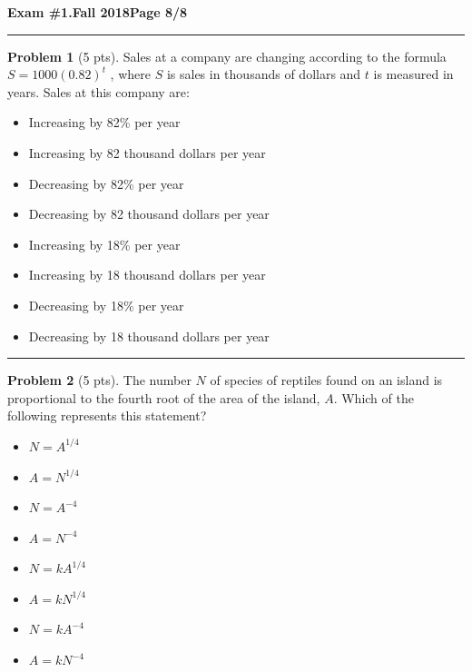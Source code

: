 \documentclass[12pt]{article}
\makeatletter
\theoremstyle{definition}
\newtheorem{problem}{Problem}
\newcommand*{\radiobutton}{%
  \@ifstar{\@radiobutton0}{\@radiobutton1}%
}
\newcommand*{\@radiobutton}[1]{%
  \begin{tikzpicture}
    \pgfmathsetlengthmacro\radius{height("X")/2}
    \draw[radius=\radius] circle;
    \ifcase#1 \fill[radius=.6*\radius] circle;\fi
  \end{tikzpicture}%
}
\makeatother
\begin{document}
\hfill{\large\bf Exam \#1.}\hfill{\large\bf  Fall 2018}\hfill{\large\bf Page 8/8}\hrule

\bigskip
\begin{problem}[5 pts]
  Sales at a company are changing according to the formula $S = 1000 (0.82)^t$ , where $S$ is sales in thousands of
  dollars and $t$ is measured in years. Sales at this company are: 
  \begin{itemize}
  \item[\radiobutton] Increasing by 82\% per year
  \item[\radiobutton] Increasing by 82 thousand dollars per year
  \item[\radiobutton] Decreasing by 82\% per year
  \item[\radiobutton] Decreasing by 82 thousand dollars per year
  \item[\radiobutton] Increasing by 18\% per year
  \item[\radiobutton] Increasing by 18 thousand dollars per year
  \item[\radiobutton] Decreasing by 18\% per year
  \item[\radiobutton] Decreasing by 18 thousand dollars per year
  \end{itemize} 
\end{problem}
\hrule

\begin{problem}[5 pts]
  The number $N$ of species of reptiles found on an island is proportional to the fourth root of the area of the island,
  $A$.  Which of the following represents this statement? 
  \begin{itemize}
  \item[\radiobutton] $N=A^{1/4}$
  \item[\radiobutton] $A=N^{1/4}$
  \item[\radiobutton] $N=A^{-4}$
  \item[\radiobutton] $A=N^{-4}$
  \item[\radiobutton] $N=kA^{1/4}$
  \item[\radiobutton] $A=kN^{1/4}$
  \item[\radiobutton] $N=kA^{-4}$
  \item[\radiobutton] $A=kN^{-4}$
  \end{itemize}
\end{problem}
\end{document}
